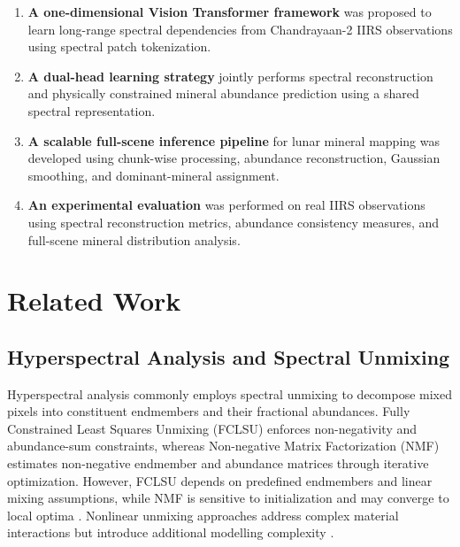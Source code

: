 \documentclass[runningheads]{llncs}
\begin{document}
\begin{enumerate}

\item \textbf{A one-dimensional Vision Transformer framework} was
proposed to learn long-range spectral dependencies from Chandrayaan-2
IIRS observations using spectral patch tokenization.

\item \textbf{A dual-head learning strategy} jointly performs spectral
reconstruction and physically constrained mineral abundance prediction
using a shared spectral representation.

\item \textbf{A scalable full-scene inference pipeline} for lunar mineral
mapping was developed using chunk-wise processing, abundance
reconstruction, Gaussian smoothing, and dominant-mineral assignment.

\item \textbf{An experimental evaluation} was performed on real IIRS
observations using spectral reconstruction metrics, abundance
consistency measures, and full-scene mineral distribution analysis.

\end{enumerate}



\section{Related Work}
\label{sec:related_work}

\subsection{Hyperspectral Analysis and Spectral Unmixing}

Hyperspectral analysis commonly employs spectral unmixing to decompose
mixed pixels into constituent endmembers and their fractional
abundances. Fully Constrained Least Squares Unmixing (FCLSU) enforces
non-negativity and abundance-sum constraints, whereas Non-negative
Matrix Factorization (NMF) estimates non-negative endmember and
abundance matrices through iterative optimization. However, FCLSU
depends on predefined endmembers and linear mixing assumptions, while
NMF is sensitive to initialization and may converge to local optima
\cite{bioucas2012unmixing,wang2023integration}. Nonlinear unmixing approaches address complex
material interactions but introduce additional modelling
complexity \cite{zhou2024blind}.
\end{document}
